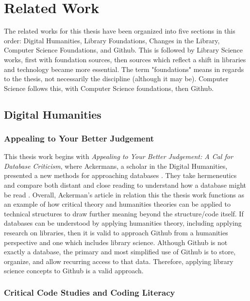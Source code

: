 \chapter{Related Work} 
\label{ch:relatedwork}

The related works for this thesis have been organized into five sections in this order: Digital Humanities, Library Foundations, Changes in the Library, Computer Science Foundations, and Github. This is followed by Library Science works, first with foundation sources, then sources which reflect a shift in libraries and technology became more essential. The term "foundations" means in regards to the thesis, not necessarily the discipline (although it may be). Computer Science follows this, with Computer Science foundations, then Github. 

\section{Digital Humanities}

\subsection{Appealing to Your Better Judgement}

This thesis work begins with \textit{Appealing to Your Better Judgement: A Cal for Database Criticism}, where Ackermans, a scholar in the Digital Humanities, presented a new methods for approaching databases \cite{ackermans2020appeal}. They take hermeneutics and compare both distant and close reading to understand how a database might be read \cite{ackermans2020appeal}. Overall, Ackerman's article in relation this the thesis work functions as an example of how critical theory and humanities theories can be applied to technical structures to draw further meaning beyond the structure/code itself. If databases can be understood by applying humanities theory, including applying research on libraries, then it is valid to approach Github from a humanities perspective and one which includes library science. Although Github is not exactly a database, the primary and most simplified use of Github is to store, organize, and allow recurring access to that data. Therefore, applying library science concepts to Github is a valid approach. 

\subsection{Critical Code Studies and Coding Literacy}


